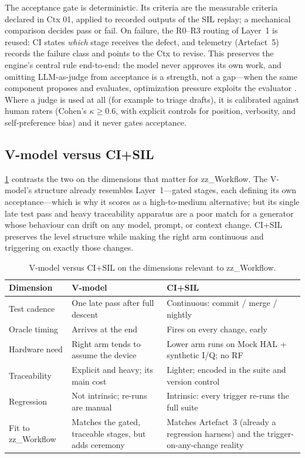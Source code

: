 \documentclass[11pt,a4paper]{article}
\begin{document}
The acceptance gate is deterministic. Its criteria are the measurable criteria declared in Ctx
01, applied to recorded outputs of the SIL replay; a mechanical comparison decides pass or fail.
On failure, the R0--R3 routing of Layer~1 is reused: CI states \emph{which} stage receives the
defect, and telemetry (Artefact~5) records the failure class and points to the Ctx to revise.
This preserves the engine's central rule end-to-end: the model never approves its own work, and
omitting LLM-as-judge from acceptance is a strength, not a gap---when the same component proposes
and evaluates, optimization pressure exploits the evaluator \cite{judge2026}. Where a judge is
used at all (for example to triage drafts), it is calibrated against human raters (Cohen's
$\kappa \geq 0.6$, with explicit controls for position, verbosity, and self-preference bias)
\cite{futureagi2026,judge2026} and it never gates acceptance.

\subsection{V-model versus CI+SIL}
\label{sec:contrast}

\cref{tab:vsil} contrasts the two on the dimensions that matter for zz\_Workflow. The
V-model's structure already resembles Layer~1---gated stages, each defining its own
acceptance---which is why it scores as a high-to-medium alternative; but its single late test
pass and heavy traceability apparatus are a poor match for a generator whose behaviour can drift
on any model, prompt, or context change. CI+SIL preserves the level structure while making the
right arm continuous and triggering on exactly those changes.

\begin{table}[htbp]
\centering
\caption{V-model versus CI+SIL on the dimensions relevant to zz\_Workflow.}
\label{tab:vsil}
\small
\begin{tabular}{@{}lp{5.1cm}p{6.6cm}@{}}
\toprule
\textbf{Dimension} & \textbf{V-model} & \textbf{CI+SIL} \\
\midrule
Test cadence & One late pass after full descent & Continuous: commit / merge / nightly \\
Oracle timing & Arrives at the end & Fires on every change, early \\
Hardware need & Right arm tends to assume the device & Lower arm runs on Mock HAL + synthetic I/Q; no RF \\
Traceability & Explicit and heavy; its main cost & Lighter; encoded in the suite and version control \\
Regression & Not intrinsic; re-runs are manual & Intrinsic: every trigger re-runs the full suite \\
Fit to zz\_Workflow & Matches the gated, traceable stages, but adds ceremony & Matches Artefact~3 (already a regression harness) and the trigger-on-any-change reality \\
\bottomrule
\end{tabular}
\end{table}
\end{document}
